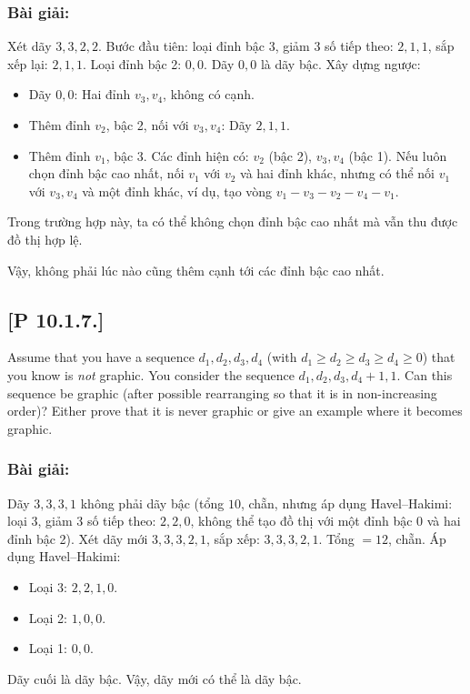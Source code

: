 \documentclass[a4paper,12pt]{article}
\begin{document}
\subsubsection*{Bài giải:}
Xét dãy \( 3, 3, 2, 2 \). Bước đầu tiên: loại đỉnh bậc 3, giảm 3 số tiếp theo: \( 2, 1, 1 \), sắp xếp lại: \( 2, 1, 1 \). Loại đỉnh bậc 2: \( 0, 0 \). Dãy \( 0, 0 \) là dãy bậc. Xây dựng ngược:
\begin{itemize}
    \item Dãy \( 0, 0 \): Hai đỉnh \( v_3, v_4 \), không có cạnh.
    \item Thêm đỉnh \( v_2 \), bậc 2, nối với \( v_3, v_4 \): Dãy \( 2, 1, 1 \).
    \item Thêm đỉnh \( v_1 \), bậc 3. Các đỉnh hiện có: \( v_2 \) (bậc 2), \( v_3, v_4 \) (bậc 1). Nếu luôn chọn đỉnh bậc cao nhất, nối \( v_1 \) với \( v_2 \) và hai đỉnh khác, nhưng có thể nối \( v_1 \) với \( v_3, v_4 \) và một đỉnh khác, ví dụ, tạo vòng \( v_1-v_3-v_2-v_4-v_1 \).
\end{itemize}
Trong trường hợp này, ta có thể không chọn đỉnh bậc cao nhất mà vẫn thu được đồ thị hợp lệ.

Vậy, không phải lúc nào cũng thêm cạnh tới các đỉnh bậc cao nhất.

\subsection*{[P 10.1.7.]} Assume that you have a sequence $d_1, d_2, d_3, d_4$ (with $d_1 \geq d_2 \geq d_3 \geq d_4 \geq 0$) that you know is \textit{not} graphic. You consider the sequence $d_1, d_2, d_3, d_4 + 1, 1$. Can this sequence be graphic (after possible rearranging so that it is in non-increasing order)? Either prove that it is never graphic or give an example where it becomes graphic.

\subsubsection*{Bài giải:}
Dãy \( 3, 3, 3, 1 \) không phải dãy bậc (tổng \( 10 \), chẵn, nhưng áp dụng Havel–Hakimi: loại 3, giảm 3 số tiếp theo: \( 2, 2, 0 \), không thể tạo đồ thị với một đỉnh bậc 0 và hai đỉnh bậc 2). Xét dãy mới \( 3, 3, 3, 2, 1 \), sắp xếp: \( 3, 3, 3, 2, 1 \). Tổng \( = 12 \), chẵn. Áp dụng Havel–Hakimi:
\begin{itemize}
    \item Loại 3: \( 2, 2, 1, 0 \).
    \item Loại 2: \( 1, 0, 0 \).
    \item Loại 1: \( 0, 0 \).
\end{itemize}
Dãy cuối là dãy bậc. Vậy, dãy mới có thể là dãy bậc.
\end{document}
